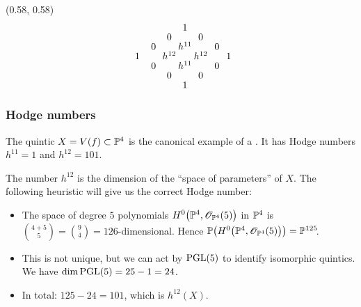 \begin{frame}
{
    \begin{textblock}{0.4}(0.58, 0.58)
        \[
            \arraycolsep = 1pt%
            \def\arraystretch{0.5}%
            \begin{array}[c]{ccccccc}
                \phantom{h^03}  & \phantom{h^{02}} & \phantom{20} & 1 \\
                &&  0 && 0      & \phantom{h^30}                      \\
                &   0 && h^{11} && 0                                  \\
                    1 && h^{12} && h^{12} && 1                        \\
                &   0 && h^{11} && 0                                  \\
                &&  0 && 0 \vphantom{h^{32}}                          \\
                &&& 1 &&   \vphantom{h^{33}}
            \end{array}
        \]
    \end{textblock}
}
\end{frame}

\begin{frame}
\frametitle{Hodge numbers}

The quintic $X = V(f) \subset \P^4$ is the canonical example of a \CY. It has Hodge numbers $h^{11}=1$ and $h^{12}=101$.

\begin{remark}[Heuristic]
    The number $h^{12}$ is the dimension of the ``space of parameters'' of $X$. The following heuristic will give us the correct Hodge number:
    \begin{itemize}
      \item
      The space of degree $5$ polynomials $H^0\big(\P^4, \OO_{\P^4}(5)\big)$ in $\P^4$ is $\binom{4 + 5}{5} = \binom{9}{4} = 126$-dimensional. Hence $\P\big(H^0\big(\P^4, \OO_{\P^4}(5)\big)\big) = \P^{125}\mkern-4mu$.
      \pause

      \item
      This is not unique, but we can act by $\PGL(5)$ to identify isomorphic quintics. We have $\dim \PGL(5)=25-1=24$.
      \pause

      \item
      In total: $125 - 24 = 101$, which is $h^{12}(X)$.
      \pause
    \end{itemize}
\end{remark}

\end{frame}